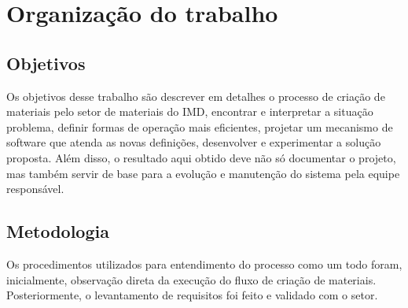 \section{Organização do trabalho}

\subsection{Objetivos}

Os objetivos desse trabalho são descrever em detalhes o processo de criação de materiais pelo setor de materiais do IMD, encontrar e interpretar a situação problema, definir formas de operação mais eficientes, projetar um mecanismo de software que atenda as novas definições, desenvolver e experimentar a solução proposta. Além disso, o resultado aqui obtido deve não só documentar o projeto, mas também servir de base para a evolução e manutenção do sistema pela equipe responsável.

%
%
%

\subsection{Metodologia}



Os procedimentos utilizados para entendimento do processo como um todo foram, inicialmente, observação direta da execução do fluxo de criação de materiais. Posteriormente, o levantamento de requisitos foi feito e validado com o setor.

